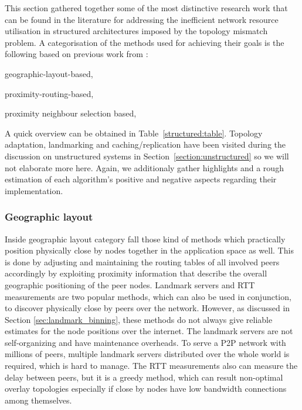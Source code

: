 This section gathered together some of the most distinctive research work that
can be found in the literature for addressing the inefficient network resource
utilisation in structured architectures imposed by the topology mismatch
problem. A categorisation of the methods used for achieving their goals is the
following based on previous work from
\cite{CDHR2002,CDCR2002,RSS2002}:
\begin{inparaenum}
  \item geographic-layout-based,
  \item proximity-routing-based,
  \item proximity neighbour selection based,
\end{inparaenum}

A quick overview can be obtained in Table~\ref{structured:table}. Topology
adaptation, landmarking and caching/replication have been visited during the
discussion on unstructured systems in Section~\ref{section:unstructured} so
we will not elaborate more here. Again, we additionaly gather highlights and a
rough estimation of each algorithm's positive and negative aspects regarding
their implementation.





\subsubsection{Geographic layout} \label{section:geographic_layout}
Inside geographic layout category fall those kind of methods which practically
position physically close by nodes together in the application space as well.
This is done by adjusting and maintaining the routing tables of all involved
peers accordingly by exploiting proximity information that describe the overall
geographic positioning of the peer nodes. Landmark servers and RTT measurements
are two popular methods, which can also be used in conjunction, to discover
physically close by peers over the network. However, as discussed in Section
\ref{sec:landmark_binning}, these methods do not always give reliable estimates
for the node positions over the internet. The landmark servers are not
self-organizing and have maintenance overheads. To serve a P2P network with
millions of peers, multiple landmark servers distributed over the whole world is
required, which is hard to manage. The RTT measurements also can measure the
delay between peers, but it is a greedy method, which can result non-optimal
overlay topologies especially if close by nodes have low bandwidth connections
among themselves.

